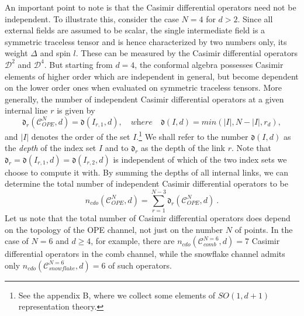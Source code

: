 \documentclass{article}
\def\dep{\mathfrak{d}}
\begin{document}
An important point to note is that the Casimir differential operators need not be 
independent. To illustrate this, consider the case $N=4$ for $d>2$. Since all external 
fields are assumed to be scalar, the single intermediate field is a symmetric traceless 
tensor and is hence characterized by two numbers only, its weight $\Delta$ and spin $l$. 
These can be measured by the Casimir differential operators  $\mathcal{D}^2$ and 
$\mathcal{D}^4$. But starting from $d =4$, the conformal algebra possesses Casimir 
elements of higher order which are independent in general, but become dependent on
the lower order ones when evaluated on symmetric traceless tensors. More generally, 
the number of independent Casimir differential operators at a given internal line 
$r$ is given by 
\begin{equation} \label{eq:depth} 
\dep_r(\mathcal{C}^N_\textit{OPE},d) = \dep(I_{r,1},d), \quad \textit{where} 
\quad \dep(I,d) = \textit{min}(|I|,N-|I|,r_d),
\end{equation} 
and $|I|$ denotes the order of the set $I$.\footnote{See the appendix B, where we collect 
some elements of $SO(1,d+1)$ representation theory.} We shall refer to the number $\dep(I,d)$ 
as the \textit{depth} of the index set $I$ and to $\dep_r$ as the depth of the link $r$. 
Note that $\dep_r = \dep(I_{r,1},d) = \dep(I_{r,2},d)$ is independent of which of the 
two index sets we choose to compute it with. By summing the depths of all internal links, we 
can determine the total number of independent Casimir differential operators to be 
\begin{equation}
n_{\textit{cdo}}(\mathcal{C}^N_\textit{OPE},d) = \sum_{r=1}^{N-3} 
\dep_r(\mathcal{C}^N_\textit{OPE},d)\ . 
\end{equation}
Let us note that the total number of Casimir differential operators does depend
on the topology of the OPE channel, not just on the number $N$ of points. 
In the case of $N=6$ and $d\geq 4$, for example, there are $n_\textit{cdo}(\mathcal{C}^{N=6}_
\textit{comb},d) = 7$ Casimir differential operators in the comb channel, while the 
snowflake channel admits only $n_\textit{cdo}(\mathcal{C}^{N=6}_\textit{snowflake},d) = 
6$ of such operators. 
\medskip 
\end{document}
